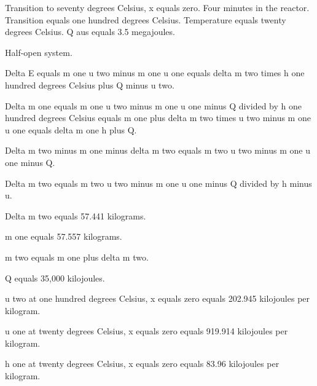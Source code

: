Transition to seventy degrees Celsius, x equals zero. Four minutes in the reactor. Transition equals one hundred degrees Celsius. Temperature equals twenty degrees Celsius. Q aus equals 3.5 megajoules.

Half-open system.

Delta E equals m one u two minus m one u one equals delta m two times h one hundred degrees Celsius plus Q minus u two.

Delta m one equals m one u two minus m one u one minus Q divided by h one hundred degrees Celsius equals m one plus delta m two times u two minus m one u one equals delta m one h plus Q.

Delta m two minus m one minus delta m two equals m two u two minus m one u one minus Q.

Delta m two equals m two u two minus m one u one minus Q divided by h minus u.

Delta m two equals 57.441 kilograms.

m one equals 57.557 kilograms.

m two equals m one plus delta m two.

Q equals 35,000 kilojoules.

u two at one hundred degrees Celsius, x equals zero equals 202.945 kilojoules per kilogram.

u one at twenty degrees Celsius, x equals zero equals 919.914 kilojoules per kilogram.

h one at twenty degrees Celsius, x equals zero equals 83.96 kilojoules per kilogram.